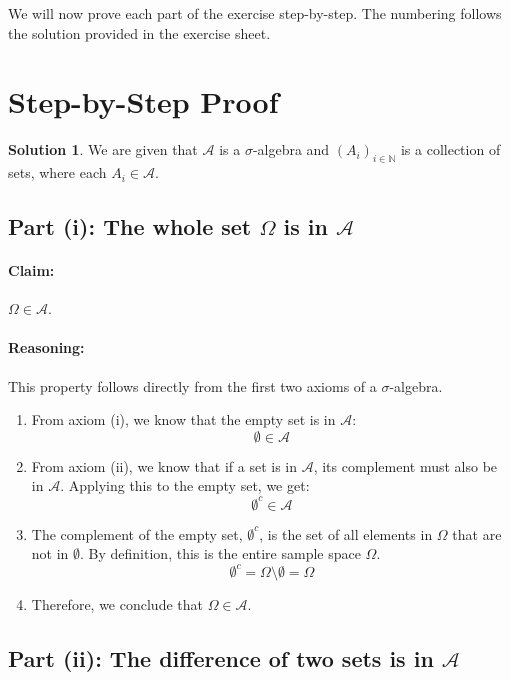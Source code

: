 \documentclass[11pt,a4paper]{article}
\theoremstyle{definition}
\newtheorem*{solution}{Solution}
\begin{document}
We will now prove each part of the exercise step-by-step. The numbering follows the solution provided in the exercise sheet.

\section{Step-by-Step Proof}

\begin{solution}
We are given that $\mathcal{A}$ is a $\sigma$-algebra and $(A_i)_{i \in \mathbb{N}}$ is a collection of sets, where each $A_i \in \mathcal{A}$.

\subsection*{Part (i): The whole set $\Omega$ is in $\mathcal{A}$}

\paragraph{Claim:} $\Omega \in \mathcal{A}$.

\paragraph{Reasoning:}
This property follows directly from the first two axioms of a $\sigma$-algebra.
\begin{enumerate}
    \item From axiom (i), we know that the empty set is in $\mathcal{A}$:
    \[ \emptyset \in \mathcal{A} \]
    \item From axiom (ii), we know that if a set is in $\mathcal{A}$, its complement must also be in $\mathcal{A}$. Applying this to the empty set, we get:
    \[ \emptyset^c \in \mathcal{A} \]
    \item The complement of the empty set, $\emptyset^c$, is the set of all elements in $\Omega$ that are not in $\emptyset$. By definition, this is the entire sample space $\Omega$.
    \[ \emptyset^c = \Omega \setminus \emptyset = \Omega \]
    \item Therefore, we conclude that $\Omega \in \mathcal{A}$.
\end{enumerate}

\subsection*{Part (ii): The difference of two sets is in $\mathcal{A}$}


\end{solution}
\end{document}
